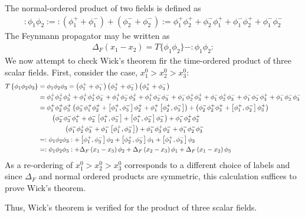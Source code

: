 {The normal-ordered product of two fields is defined as
\begin{align*}
    :\phi_1\phi_2:=:\left(\phi_1^++\phi_1^-\right)+\left(\phi_2^-+\phi_2^-\right):=\phi_1^+\phi_2^++\phi_2^-\phi_1^++\phi_1^-\phi_2^++\phi_1^-\phi_2^-
\end{align*}
The Feynmann propagator may be written as
\begin{align}
    \Delta_F\left(x_1-x_2\right)=T\{\phi_1\phi_2\}-:\phi_1\phi_2:
\end{align}
We now attempt to check Wick's theorem fir the time-ordered product of three scalar fields. First, consider the case, $x_1^0>x_2^0>x_3^0$:
\begin{align}
    T\left\{\phi_1\phi_2\phi_3\right\}&=\phi_1\phi_2\phi_3=\left(\phi_1^++\phi_1^-\right)\left(\phi_2^++\phi_2^-\right)\left(\phi_3^++\phi_3^-\right)\notag\\
    &=\phi_1^+\phi_2^+\phi_3^++\phi_1^+\phi_2^+\phi_3^-+\phi_1^+\phi_2^-\phi_3^++\phi_1^+\phi_2^-\phi_3^-+\phi_1^-\phi_2^+\phi_3^++\phi_1^-\phi_2^+\phi_3^-+\phi_1^-\phi_2^-\phi_3^++\phi_1^-\phi_2^-\phi_3^-\notag\\
    &=\phi_1^+\phi_2^+\phi_3^+\left(\phi_3^-\phi_1^+\phi_2^++\left[\phi_1^+,\phi_3^-\right]\phi_2^++\phi_1^+\left[\phi_2^+,\phi_3^-\right]\right)+\left(\phi_2^-\phi_2^+\phi_3^++\left[\phi_1^+,\phi_2^-\right]\phi_3^+\right)\notag\\
    &\hspace{20pt}\left(\phi_2^-\phi_3^-\phi_1^++\phi_2^-\left[\phi_1^+,\phi_3^-\right]+\left[\phi_1^+,\phi_2^-\right]\phi_3^-\right)+\phi_1^-\phi_2^+\phi_3^+\notag\\
    &\hspace{40pt}\left(\phi_1^-\phi_2^+\phi_3^-+\phi_1^-\left[\phi_1^+,\phi_3^-\right]\right)+\phi_1^-\phi_3^+\phi_2^-+\phi_1^-\phi_2^-\phi_3^-\notag\\
    &=:\phi_1\phi_2\phi_3:+\left[\phi_1^+,\phi_3^-\right]\phi_2+\left[\phi_2^+,\phi_3^-\right]\phi_1+\left[\phi_1^+,\phi_3^-\right]\phi_3\notag\\
    &=:\phi_1\phi_2\phi_3:+\Delta_F\left(x_1-x_3\right)\phi_2+\Delta_F\left(x_2-x_3\right)\phi_1+\Delta_F\left(x_1-x_2\right)\phi_3\notag
\end{align}
As a re-ordering of $x_1^0>x_2^0>x_3^0$ corresponds to a different choice of labels and since $\Delta_F$ and normal ordered products are symmetric, this calculation suffices to prove Wick’s theorem.

Thus, Wick's theorem is verified for the product of three scalar fields.

}
